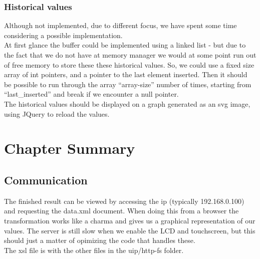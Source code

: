 \subsubsection{Historical values}
Although not implemented, due to different focus, we have spent some time considering a possible implementation.\\
At first glance the buffer could be implemented using a linked list - but due to the fact that we do not have at memory manager we would at some point run out of free memory to store these these historical values. So, we could use a fixed size array of int pointers, and a pointer to the last element inserted. Then it should be possible to run through the array ``array-size'' number of times, starting from ``last\_inserted'' and break if we encounter a null pointer.\\
The historical values should be displayed on a graph generated as an svg image, using JQuery to reload the values.

\section{Chapter Summary}
\label{sec:SummaryDescription}
\subsection{Communication}
The finished result can be viewed by accessing the ip (typically 192.168.0.100) and requesting the data.xml document. When doing this from a browser the transformation works like a charma and gives us a graphical representation of our values. The server is still slow when we enable the LCD and touchscreen, but this should just a matter of opimizing the code that handles these.\\
The xsl file is with the other files in the uip/http-fs folder. 
